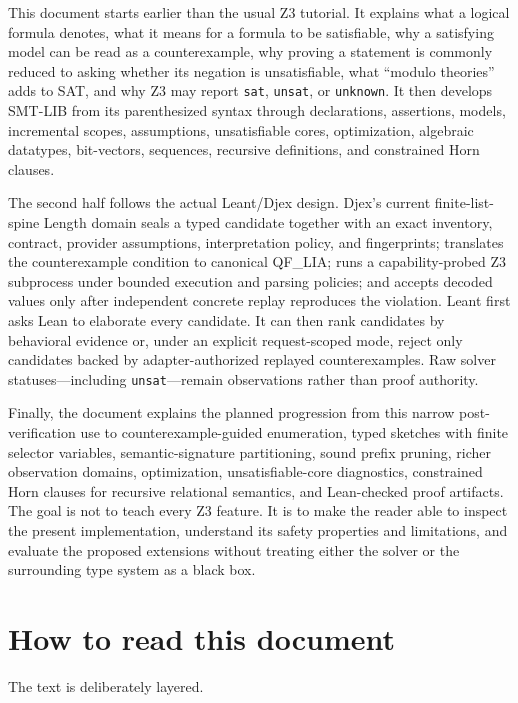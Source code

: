 \documentclass[10pt,letterpaper,oneside]{report}
\newcommand{\code}[1]{\texttt{\detokenize{#1}}}
\newcommand{\QFLIA}{\textsf{QF\_LIA}}
\newcommand{\sat}{\texttt{sat}}
\newcommand{\unsat}{\texttt{unsat}}
\newcommand{\unknown}{\texttt{unknown}}
\begin{document}
This document starts earlier than the usual Z3 tutorial. It explains what a logical formula denotes, what it means for a formula to be satisfiable, why a satisfying model can be read as a counterexample, why proving a statement is commonly reduced to asking whether its negation is unsatisfiable, what ``modulo theories'' adds to SAT, and why Z3 may report \sat, \unsat, or \unknown. It then develops SMT-LIB from its parenthesized syntax through declarations, assertions, models, incremental scopes, assumptions, unsatisfiable cores, optimization, algebraic datatypes, bit-vectors, sequences, recursive definitions, and constrained Horn clauses.

The second half follows the actual Leant/Djex design. Djex's current finite-list-spine Length domain seals a typed candidate together with an exact inventory, contract, provider assumptions, interpretation policy, and fingerprints; translates the counterexample condition to canonical \QFLIA; runs a capability-probed Z3 subprocess under bounded execution and parsing policies; and accepts decoded values only after independent concrete replay reproduces the violation. Leant first asks Lean to elaborate every candidate. It can then rank candidates by behavioral evidence or, under an explicit request-scoped \code{filter} mode, reject only candidates backed by adapter-authorized replayed counterexamples. Raw solver statuses---including \unsat---remain observations rather than proof authority.

Finally, the document explains the planned progression from this narrow post-verification use to counterexample-guided enumeration, typed sketches with finite selector variables, semantic-signature partitioning, sound prefix pruning, richer observation domains, optimization, unsatisfiable-core diagnostics, constrained Horn clauses for recursive relational semantics, and Lean-checked proof artifacts. The goal is not to teach every Z3 feature. It is to make the reader able to inspect the present implementation, understand its safety properties and limitations, and evaluate the proposed extensions without treating either the solver or the surrounding type system as a black box.

\chapter*{How to read this document}

The text is deliberately layered.
\end{document}
